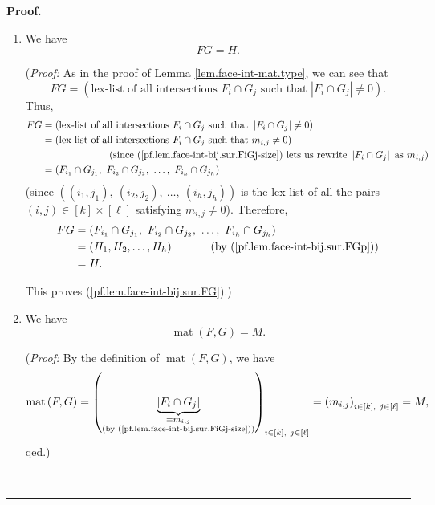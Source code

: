 \documentclass[12pt]{article}
\theoremstyle{definition}%
\theoremstyle{definition}%
\theoremstyle{remark}%
\newcommand{\interval}[1]{\left[ #1 \right]} %
\newcommand{\mat}{\operatorname{mat}}
\newenvironment{proof}[1][Proof]{\noindent\textbf{#1.} }{\ \rule{0.5em}{0.5em}}
\begin{document}
\begin{proof}
\begin{enumerate}
\item We have
\begin{equation}
FG=H.
\label{pf.lem.face-int-bij.sur.FG}
\end{equation}


(\textit{Proof:} As in the proof of Lemma \ref{lem.face-int-mat.type}, we can
see that
\[
FG=\left(  \text{lex-list of all intersections }F_{i}\cap G_{j}\text{ such
that }\left\vert F_{i}\cap G_{j}\right\vert \neq0\right)  .
\]
Thus,
\begin{align*}
FG &  =\left(  \text{lex-list of all intersections }F_{i}\cap G_{j}\text{ such
that }\left\vert F_{i}\cap G_{j}\right\vert \neq0\right)  \\
&  =\left(  \text{lex-list of all intersections }F_{i}\cap G_{j}\text{ such
that }m_{i,j}\neq0\right)  \\
&  \ \ \ \ \ \ \ \ \ \ \ \ \ \ \ \ \ \ \ \ \left(  \text{since
(\ref{pf.lem.face-int-bij.sur.FiGj-size}) lets us rewrite }\left\vert
F_{i}\cap G_{j}\right\vert \text{ as }m_{i,j}\right)  \\
&  =\left(  F_{i_{1}}\cap G_{j_{1}},\ F_{i_{2}}\cap G_{j_{2}},\ \ldots
,\ F_{i_{h}}\cap G_{j_{h}}\right)
\end{align*}
(since $\left(  \left(  i_{1},j_{1}\right)  ,\ \left(  i_{2},j_{2}\right)
,\ \ldots,\ \left(  i_{h},j_{h}\right)  \right)  $ is the lex-list of all the
pairs $\left(  i,j\right)  \in\interval{k}  \times\interval{\ell}$
satisfying $m_{i,j}\neq0$). Therefore,
\begin{align*}
FG &  =\left(  F_{i_{1}}\cap G_{j_{1}},\ F_{i_{2}}\cap G_{j_{2}}
,\ \ldots,\ F_{i_{h}}\cap G_{j_{h}}\right)  \\
&  =\left(  H_{1},H_{2},\ldots,H_{h}\right)  \ \ \ \ \ \ \ \ \ \ \left(
\text{by (\ref{pf.lem.face-int-bij.sur.FGp})}\right)  \\
&  =H.
\end{align*}


This proves (\ref{pf.lem.face-int-bij.sur.FG}).)

\item We have
\begin{equation}
\mat\left(  F,G\right)  =M.
\label{pf.lem.face-int-bij.sur.mat}
\end{equation}


(\textit{Proof:} By the definition of $\mat\left(  F,G\right)
$, we have
\[
\mat\left(  F,G\right)  =\left(  \underbrace{\left\vert
F_{i}\cap G_{j}\right\vert }_{\substack{=m_{i,j}\\\text{(by
(\ref{pf.lem.face-int-bij.sur.FiGj-size}))}}}\right)  _{i\in\interval{k}
,\ j\in\interval{\ell}}=\left(  m_{i,j}\right)  _{i\in\interval{k}
,\ j\in\interval{\ell}}=M,
\]
qed.)
\end{enumerate}


\end{proof}
\end{document}
